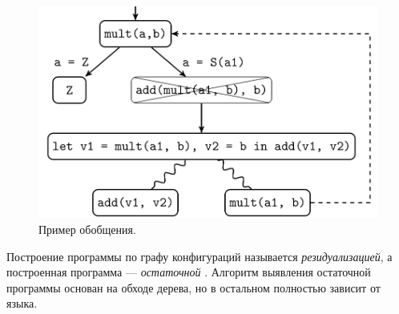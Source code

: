 \begin{figure}[h!]
\includegraphics[scale=0.3]{./review/scgenex_temp.png}
\caption{Пример обобщения.}
\label{fig:pgraphFoldingExample}
\end{figure}

Построение программы по графу конфигураций называется \emph{резидуализацией}, а
построенная программа --- \emph{остаточной} .
Алгоритм выявления остаточной программы основан на обходе дерева, но
в остальном полностью зависит от языка.

